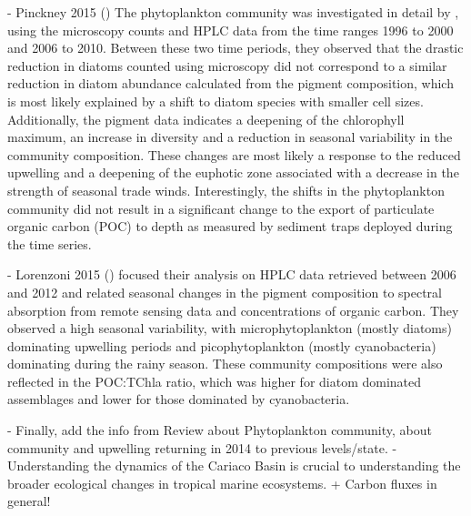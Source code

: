     - Pinckney 2015 ()
    The phytoplankton community was investigated in detail by , using the microscopy counts and HPLC data from the time ranges 1996 to 2000 and 2006 to 2010. Between these two time periods, they observed that the drastic reduction in diatoms counted using microscopy did not correspond to a similar reduction in diatom abundance calculated from the pigment composition, which is most likely explained by a shift to diatom species with smaller cell sizes. Additionally, the pigment data indicates a deepening of the chlorophyll maximum, an increase in diversity and a reduction in seasonal variability in the community composition. These changes are most likely a response to the reduced upwelling  and a deepening of the euphotic zone associated with a decrease in the strength of seasonal trade winds. Interestingly, the shifts in the phytoplankton community did not result in a significant change to the export of particulate organic carbon (POC) to depth as measured by sediment traps deployed during the time series. 

    - Lorenzoni 2015 ()
     focused their analysis on HPLC data retrieved between 2006 and 2012 and related seasonal changes in the pigment composition to spectral absorption from remote sensing data and concentrations of organic carbon. They observed a high seasonal variability, with microphytoplankton (mostly diatoms) dominating upwelling periods and picophytoplankton (mostly cyanobacteria) dominating during the rainy season. These community compositions were also reflected in the POC:TChla ratio, which was higher for diatom dominated assemblages and lower for those dominated by cyanobacteria. 
    

    
    - Finally, add the info from Review about Phytoplankton community, about community and upwelling returning in 2014 to previous levels/state.
    - Understanding the dynamics of the Cariaco Basin is crucial to understanding the broader ecological changes in tropical marine ecosystems. + Carbon fluxes in general!

